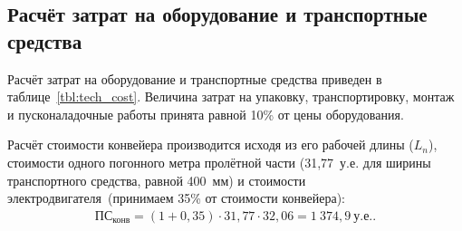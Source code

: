 \vspace{-5mm}

\subsection{Расчёт затрат на оборудование и транспортные средства}

Расчёт затрат на оборудование и транспортные средства
приведен в таблице~\ref{tbl:tech_cost}. Величина затрат на упаковку,
транспортировку, монтаж и пусконаладочные работы принята равной 10\%
от цены оборудования.

Расчёт стоимости конвейера производится исходя из его рабочей длины ($ L_n $),
стоимости одного погонного метра пролётной части (31,77~у.е. для ширины
транспортного средства, равной 400~мм) и стоимости электродвигателя~(принимаем
35\% от стоимости конвейера):
\begin{align*}
  \text{ПС}_{\text{конв}} = (1 + 0{,}35) \cdot 31{,}77 \cdot 32{,}06 = 1~374{,}9~\text{у.е.}.
\end{align*}

